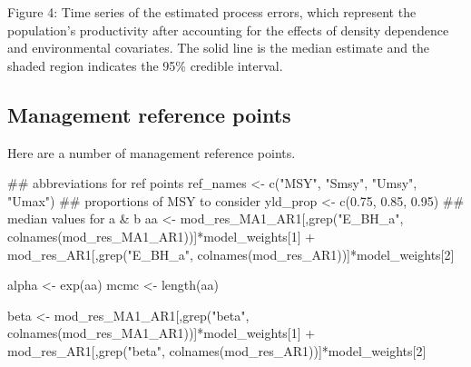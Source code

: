 \documentclass[
  11pt,
]{article}
\newenvironment{Shaded}{}{}
\newcommand{\CommentTok}[1]{\textcolor[rgb]{0.00,0.50,0.00}{#1}}
\newcommand{\DecValTok}[1]{#1}
\newcommand{\FloatTok}[1]{#1}
\newcommand{\KeywordTok}[1]{\textcolor[rgb]{0.00,0.00,1.00}{#1}}
\newcommand{\NormalTok}[1]{#1}
\newcommand{\OperatorTok}[1]{#1}
\newcommand{\StringTok}[1]{\textcolor[rgb]{0.00,0.50,0.50}{#1}}
\begin{document}
Figure 4: Time series of the estimated process errors, which represent
the population's productivity after accounting for the effects of
density dependence and environmental covariates. The solid line is the
median estimate and the shaded region indicates the 95\% credible
interval.

\hypertarget{management-reference-points}{%
\subsection{Management reference
points}\label{management-reference-points}}

Here are a number of management reference points.

\begin{Shaded}
\begin{Highlighting}[]
\CommentTok{## abbreviations for ref points}
\NormalTok{ref_names <-}\StringTok{ }\KeywordTok{c}\NormalTok{(}\StringTok{"MSY"}\NormalTok{, }\StringTok{"Smsy"}\NormalTok{, }\StringTok{"Umsy"}\NormalTok{, }\StringTok{"Umax"}\NormalTok{)}
\CommentTok{## proportions of MSY to consider}
\NormalTok{yld_prop <-}\StringTok{ }\KeywordTok{c}\NormalTok{(}\FloatTok{0.75}\NormalTok{, }\FloatTok{0.85}\NormalTok{, }\FloatTok{0.95}\NormalTok{)}
\CommentTok{## median values for a & b}
\NormalTok{aa <-}\StringTok{ }\NormalTok{mod_res_MA1_AR1[,}\KeywordTok{grep}\NormalTok{(}\StringTok{"E_BH_a"}\NormalTok{, }\KeywordTok{colnames}\NormalTok{(mod_res_MA1_AR1))]}\OperatorTok{*}\NormalTok{model_weights[}\DecValTok{1}\NormalTok{] }\OperatorTok{+}\StringTok{ }\NormalTok{mod_res_AR1[,}\KeywordTok{grep}\NormalTok{(}\StringTok{"E_BH_a"}\NormalTok{, }\KeywordTok{colnames}\NormalTok{(mod_res_AR1))]}\OperatorTok{*}\NormalTok{model_weights[}\DecValTok{2}\NormalTok{] }

\NormalTok{alpha <-}\StringTok{ }\KeywordTok{exp}\NormalTok{(aa)}
\NormalTok{mcmc <-}\StringTok{ }\KeywordTok{length}\NormalTok{(aa)}

\NormalTok{beta <-}\StringTok{ }\NormalTok{mod_res_MA1_AR1[,}\KeywordTok{grep}\NormalTok{(}\StringTok{"beta"}\NormalTok{, }\KeywordTok{colnames}\NormalTok{(mod_res_MA1_AR1))]}\OperatorTok{*}\NormalTok{model_weights[}\DecValTok{1}\NormalTok{] }\OperatorTok{+}\StringTok{ }\NormalTok{mod_res_AR1[,}\KeywordTok{grep}\NormalTok{(}\StringTok{"beta"}\NormalTok{, }\KeywordTok{colnames}\NormalTok{(mod_res_AR1))]}\OperatorTok{*}\NormalTok{model_weights[}\DecValTok{2}\NormalTok{] }


\end{Highlighting}
\end{Shaded}
\end{document}
